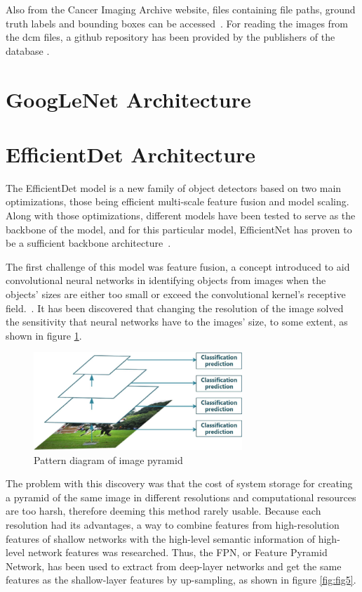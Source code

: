 Also from the Cancer Imaging Archive website, files containing file paths, ground truth labels and bounding boxes can be accessed~\cite{carte7}. For reading the images from the dcm files, a github repository has been provided by the publishers of the data\-base \cite{link5}.

\section{GoogLeNet Architecture}

\section{EfficientDet Architecture}

The EfficientDet model is a new family of object detectors based on two main optimizations, those being efficient multi-scale feature fusion and model scaling. Along with those optimizations, different models have been tested to serve as the backbone of the model, and for this particular model, EfficientNet has proven to be a sufficient backbone architecture~\cite{carte8}.

The first challenge of this model was feature fusion, a concept introduced to aid convolutional neural networks in identifying objects from images when the objects' sizes are either too small or exceed the convolutional kernel's receptive field.~\cite{carte9}. It has been discovered that changing the resolution of the image solved the sensitivity that neural networks have to the images' size, to some extent, as shown in figure \ref{fig:fig4}.

\begin{figure}[!ht]
    \centering
    \includegraphics[width=0.7\textwidth]{figures/Figure4.png}
    \caption{Pattern diagram of image pyramid}
    \label{fig:fig4}
\end{figure}

The problem with this discovery was that the cost of system storage for creating a pyramid of the same image in different resolutions and computational resources are too harsh, therefore deeming this method rarely usable. Because each resolution had its advantages, a way to combine features from high-resolution features of shallow networks with the high-level semantic information of high-level network features was researched. Thus, the FPN, or Feature Pyramid Network, has been used to extract from deep-layer networks and get the same features as the shallow-layer features by up-sampling, as shown in figure \ref{fig:fig5}. 

